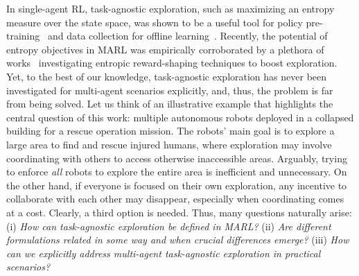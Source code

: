 In single-agent RL, task-agnostic exploration, such as maximizing an entropy measure over the state space, was shown to be a useful tool for policy pre-training~\citep{hazan2019provably,mutti2021taskagnosticexplorationpolicygradient} and data collection for offline learning~\citep{yarats2022don}. Recently, the potential of entropy objectives in MARL was empirically corroborated by a plethora of works~\citep{liu2021cooperative, zhang2021made, xu2024population} investigating entropic reward-shaping techniques to boost exploration. Yet, to the best of our knowledge, task-agnostic exploration has never been investigated for multi-agent scenarios explicitly, and, thus, the problem is far from being solved. Let us think of an illustrative example that highlights the central question of this work: multiple autonomous robots deployed in a collapsed building for a rescue operation mission. The robots' main goal is to explore a large area to find and rescue injured humans, where exploration may involve coordinating with others to access otherwise inaccessible areas. Arguably, trying to enforce \emph{all} robots to explore the entire area is inefficient and unnecessary. On the other hand, if everyone is focused on their own exploration, any incentive to collaborate with each other may disappear, especially when coordinating comes at a cost. Clearly, a third option is needed. Thus, many questions naturally arise: (i) \emph{How can task-agnostic exploration be defined in MARL?} (ii) \emph{Are different formulations related in some way and when crucial differences emerge?} (iii) \emph{How can we explicitly address multi-agent task-agnostic exploration in practical scenarios?}

